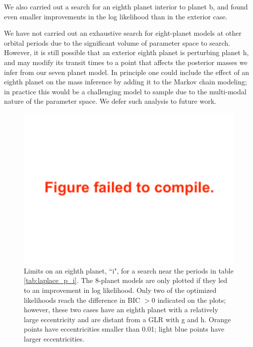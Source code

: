 \documentclass[twocolumn]{aastex63}
\begin{document}
We also carried out a search for an eighth planet interior to planet
b, and found even smaller improvements in the log likelihood than
in the exterior case.

We have not carried out an exhaustive search for eight-planet models
at other orbital periods due to the significant volume of parameter
space to search.   However, it is still possible that an exterior
eighth planet is perturbing planet h, and may modify its transit
times to a point that affects the posterior masses we infer from
our seven planet model.   In principle one could include the effect
of an eighth planet on the mass inference by adding it to the Markov
chain modeling;  in practice this would be a challenging model to
sample due to the multi-modal nature of the parameter space.
We defer such analysis to future work.

\begin{figure}
    \centering
    \includegraphics[width=\hsize]{figures/Planet_i_properties.pdf}
    {Limits on an eighth planet, ``i", for a search near
        the periods in table \ref{tab:laplace_p_i}.  The 8-planet
        models are only plotted if they led to an improvement in log likelihood.
        Only two of the optimized
        likelihoods reach the difference in BIC ${>}0$ indicated on the plots; however, these two cases have an eighth planet with a relatively large eccentricity and are distant from a GLR with g and h.  Orange points have eccentricities smaller than 0.01;  light blue points have larger eccentricities.}
    \label{fig:planet_i}
\end{figure}
\end{document}
